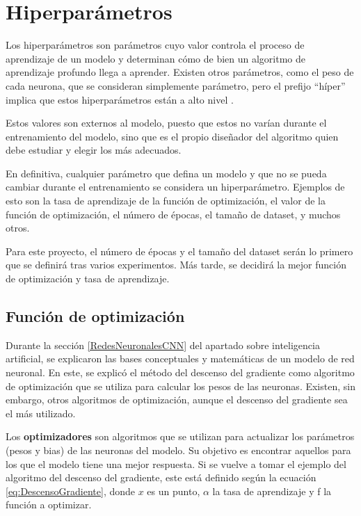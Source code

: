 \documentclass{report}
\begin{document}
\newpage
\section{Hiperparámetros}\label{Hiperparametrosteoria}


Los hiperparámetros son parámetros cuyo valor controla el proceso de aprendizaje de un modelo y determinan cómo de bien un algoritmo de aprendizaje profundo llega a aprender. Existen otros parámetros, como el peso de cada neurona, que se consideran simplemente parámetro, pero el prefijo ``híper'' implica que estos hiperparámetros están a alto nivel \cite{WebHiperparametros}.

Estos valores son externos al modelo, puesto que estos no varían durante el entrenamiento del modelo, sino que es el propio diseñador del algoritmo quien debe estudiar y elegir los más adecuados.

En definitiva, cualquier parámetro que defina un modelo y que no se pueda cambiar durante el entrenamiento se considera un hiperparámetro. Ejemplos de esto son la tasa de aprendizaje de la función de optimización, el valor de la función de optimización, el número de épocas, el tamaño de dataset, y muchos otros.

Para este proyecto, el número de épocas y el tamaño del dataset serán lo primero que se definirá tras varios experimentos. Más tarde, se decidirá la mejor función de optimización y tasa de aprendizaje.


\subsection{Función de optimización}

Durante la sección \ref{RedesNeuronalesCNN} del apartado sobre inteligencia artificial, se explicaron las bases conceptuales y matemáticas de un modelo de red neuronal. En este, se explicó el método del descenso del gradiente como algoritmo de optimización que se utiliza para calcular los pesos de las neuronas. Existen, sin embargo, otros algoritmos de optimización, aunque el descenso del gradiente sea el más utilizado. 


Los \textbf{optimizadores} son algoritmos que se utilizan para actualizar los parámetros (pesos y bias) de las neuronas del modelo. Su objetivo es encontrar aquellos para los que el modelo tiene una mejor respuesta. Si se vuelve a tomar el ejemplo del algoritmo del descenso del gradiente, este está definido según la ecuación \ref{eq:DescensoGradiente}, donde $x$ es un punto, $\alpha$ la tasa de aprendizaje y f la función a optimizar.
\end{document}
